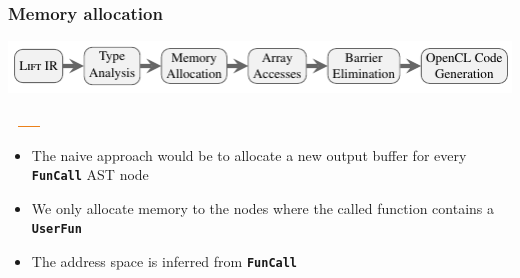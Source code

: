 \documentclass[10pt,usetotalslideindicator]{beamer}
\newcommand{\code}[1]{\textbf{\texttt{#1}}}
\begin{document}
\begin{frame}[t]
\frametitle{Memory allocation}
    \vspace{-1cm}
    \begin{block}{}
        \begin{center}
            \includegraphics[width=1\textwidth]{../images/compilation_stages.pdf}
        \end{center}
        \vspace{-1.05cm}
        \hspace{3.36cm}
        \includegraphics[width=1.1cm, height=0.03cm]{../images/orange_bar.png}
        \vspace{.45cm}
    \end{block}
    \vspace{-0.5cm}
\begin{itemize}
	\item The naive approach would be to allocate a new output buffer for every \code{FunCall} AST node
	\item We only allocate memory to the nodes where the called function contains a \code{UserFun}
	\item The address space is inferred from \code{FunCall}
\end{itemize}
\end{frame}
\end{document}
